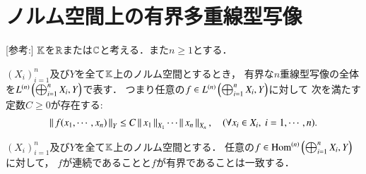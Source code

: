 \section{ノルム空間上の有界多重線型写像}
	[参考:\cite{key7}] $\K$を$\R$または$\C$と考える．また$n \geq 1$とする．
	\begin{screen}
		\begin{dfn}[有界な多重線型写像]
			$(X_i)_{i=1}^n$及び$Y$を全て$\K$上のノルム空間とするとき，
			有界な$n$重線型写像の全体を$\ContLn{\bigoplus_{i=1}^n X_i}{Y}{n}$で表す．
			つまり任意の$f \in \ContLn{\bigoplus_{i=1}^n X_i}{Y}{n}$に対して
			次を満たす定数$C \geq 0$が存在する:
			\begin{align}
				\Norm{f(x_1,\cdots,x_n)}{Y} \leq C \Norm{x_1}{X_1}\cdots\Norm{x_n}{X_n},
				\quad (\forall x_i \in X_i,\ i=1,\cdots,n).
				\label{eq:def_bounced_multilinear_mapping}
			\end{align}
		\end{dfn}
	\end{screen}
	
	\begin{screen}
		\begin{thm}[有界$\Leftrightarrow$連続]
			$(X_i)_{i=1}^n$及び$Y$を全て$\K$上のノルム空間とする．
			任意の$f \in \Ln{\bigoplus_{i=1}^n X_i}{Y}{n}$に対して，
			$f$が連続であることと$f$が有界であることは一致する．
		\end{thm}
	\end{screen}
	
